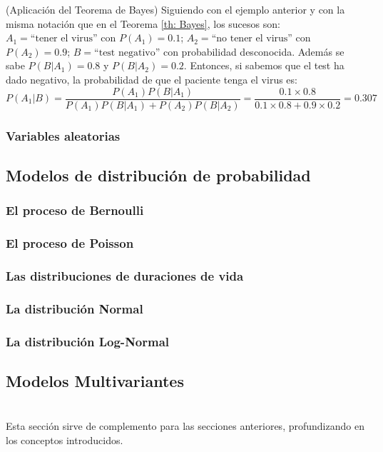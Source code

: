 \begin{example}(Aplicación del Teorema de Bayes)	
Siguiendo con el ejemplo anterior y con la misma notación que en el Teorema \ref{th: Bayes}, los sucesos son: $A_1 = \textrm{``tener el virus''}$ con $P(A_1) = 0.1$; $A_2 = \textrm{``no tener el virus''}$ con $P(A_2) = 0.9$; $B = \textrm{``test negativo''}$ con probabilidad desconocida. Además se sabe $P(B|A_1) = 0.8$ y $P(B|A_2) = 0.2$. Entonces, si sabemos que el test ha dado negativo, la probabilidad de que el paciente tenga el virus es:
$$P(A_1|B) = \frac{P(A_1)P(B|A_1)}{P(A_1)P(B|A_1)+ P(A_2)P(B|A_2)} = \frac{0.1 \times 0.8}{0.1 \times 0.8 + 0.9\times 0.2} = 0.307$$
\end{example}
\subsubsection{Variables aleatorias}
\subsection{Modelos de distribución de probabilidad}
\subsubsection{El proceso de Bernoulli}
\subsubsection{El proceso de Poisson}
\subsubsection{Las distribuciones de duraciones de vida}
\subsubsection{La distribución Normal}
\subsubsection{La distribución Log-Normal}
\subsection{Modelos Multivariantes}
\break
\section*{}
Esta sección sirve de complemento para las secciones anteriores, profundizando en los conceptos introducidos. 
\section*{}
\section*{}
